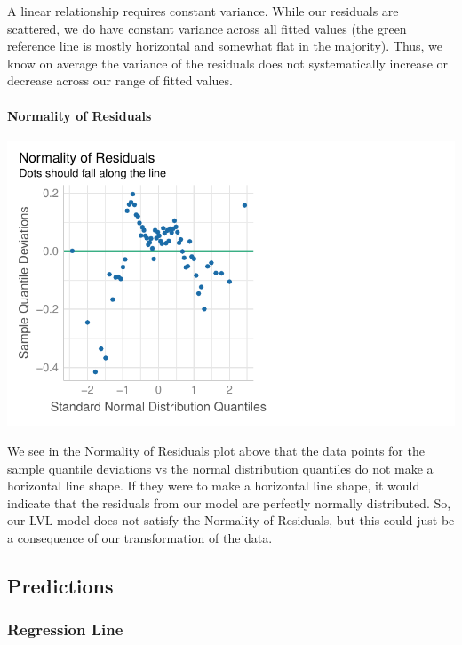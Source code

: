 \documentclass[
  letterpaper,
  DIV=11,
  numbers=noendperiod]{scrartcl}
\let\oldparagraph\paragraph
\renewcommand{\paragraph}[1]{\oldparagraph{#1}\mbox{}}
\begin{document}
A linear relationship requires constant variance. While our residuals
are scattered, we do have constant variance across all fitted values
(the green reference line is mostly horizontal and somewhat flat in the
majority). Thus, we know on average the variance of the residuals does
not systematically increase or decrease across our range of fitted
values.

\hypertarget{normality-of-residuals}{%
\paragraph{Normality of Residuals}\label{normality-of-residuals}}

\includegraphics{sds-291_s-24_case-study-template_files/figure-pdf/unnamed-chunk-9-1.pdf}

We see in the Normality of Residuals plot above that the data points for
the sample quantile deviations vs the normal distribution quantiles do
not make a horizontal line shape. If they were to make a horizontal line
shape, it would indicate that the residuals from our model are perfectly
normally distributed. So, our LVL model does not satisfy the Normality
of Residuals, but this could just be a consequence of our transformation
of the data.

\hypertarget{predictions}{%
\subsection{Predictions}\label{predictions}}

\hypertarget{regression-line}{%
\subsubsection{Regression Line}\label{regression-line}}
\end{document}
